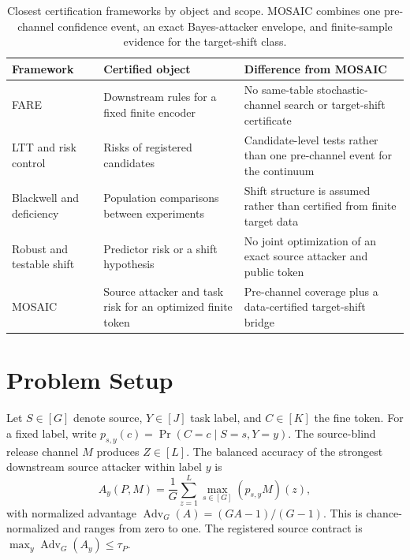 \begin{table}[t]
\centering
\small
\setlength{\tabcolsep}{5pt}
\begin{tabular}{p{}p{}p{}}
\hline
Framework & Certified object & Difference from MOSAIC \\
\hline
FARE \citep{jovanovic2023fare} & Downstream rules for a fixed finite encoder
& No same-table stochastic-channel search or target-shift certificate \\
LTT and risk control \citep{angelopoulos2025ltt,bates2021rcps}
& Risks of registered candidates
& Candidate-level tests rather than one pre-channel event for the continuum \\
Blackwell and deficiency
\citep{blackwell1953experiments,lecam1964sufficiency}
& Population comparisons between experiments
& Shift structure is assumed rather than certified from finite target data \\
Robust and testable shift
\citep{cauchois2024robust,klivans2024testable}
& Predictor risk or a shift hypothesis
& No joint optimization of an exact source attacker and public token \\
MOSAIC & Source attacker and task risk for an optimized finite token
& Pre-channel coverage plus a data-certified target-shift bridge \\
\hline
\end{tabular}
\caption{Closest certification frameworks by object and scope. MOSAIC combines
one pre-channel confidence event, an exact Bayes-attacker envelope, and
finite-sample evidence for the target-shift class.}
\label{tab:components}
\end{table}

\section{Problem Setup}

Let $S\in[G]$ denote source, $Y\in[J]$ task label, and $C\in[K]$ the fine token.
For a fixed label, write $p_{s,y}(c)=\Pr(C=c\mid S=s,Y=y)$. The source-blind release
channel $M$ produces $Z\in[L]$. The balanced accuracy of the strongest
downstream source attacker within label $y$ is
\begin{equation}
 A_y(P,M)=\frac{1}{G}\sum_{z=1}^{L}\max_{s\in[G]}(p_{s,y}M)(z),
 \label{eq:attacker}
\end{equation}
with normalized advantage
$\operatorname{Adv}_G(A)=(GA-1)/(G-1)$. This is chance-normalized and ranges
from zero to one. The registered source contract is
$\max_y\operatorname{Adv}_G(A_y)\leq\tau_P$.

